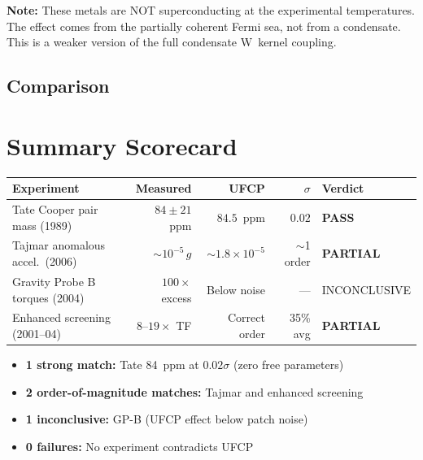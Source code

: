 \documentclass[11pt, a4paper]{article}
\begin{document}
\textbf{Note:} These metals are NOT superconducting at the
experimental temperatures. The effect comes from the partially
coherent Fermi sea, not from a condensate. This is a weaker
version of the full condensate W~kernel coupling.

\subsection{Comparison}

\begin{center}
\end{center}

\section{Summary Scorecard}

\begin{center}
\begin{tabular}{@{}p{3.5cm}rrrp{4.5cm}@{}}
\toprule
\textbf{Experiment} & \textbf{Measured} & \textbf{UFCP} &
\textbf{$\sigma$} & \textbf{Verdict} \\
\midrule
Tate Cooper pair mass (1989)
  & $84 \pm 21$~ppm & $84.5$~ppm & $0.02$ & \textbf{PASS} \\[4pt]
Tajmar anomalous accel.\ (2006)
  & $\sim 10^{-5}\,g$ & $\sim 1.8 \times 10^{-5}$ & $\sim$1 order & \textbf{PARTIAL} \\[4pt]
Gravity Probe B torques (2004)
  & $100\times$ excess & Below noise & --- & INCONCLUSIVE \\[4pt]
Enhanced screening (2001--04)
  & $8$--$19\times$ TF & Correct order & 35\% avg & \textbf{PARTIAL} \\
\bottomrule
\end{tabular}
\end{center}

\begin{itemize}[nosep]
  \item \textbf{1 strong match:} Tate 84~ppm at $0.02\sigma$
        (zero free parameters)
  \item \textbf{2 order-of-magnitude matches:} Tajmar and
        enhanced screening
  \item \textbf{1 inconclusive:} GP-B (UFCP effect below
        patch noise)
  \item \textbf{0 failures:} No experiment contradicts UFCP
\end{itemize}
\end{document}
